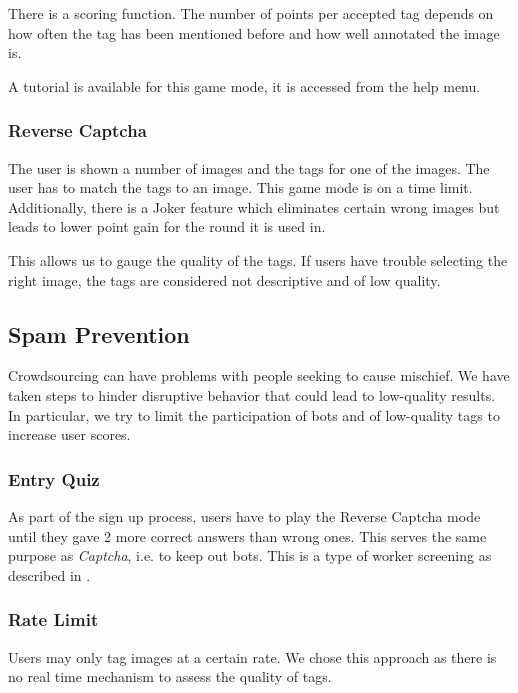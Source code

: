 There is a scoring function. The number of points per accepted tag depends on how often the tag has been mentioned before and how well annotated the image is.

A tutorial is available for this game mode, it is accessed from the help menu.

\subsubsection{Reverse Captcha}
\label{g14:sec:concepts:Gamemodes:reversecaptca}
The user is shown a number of images and the tags for one of the images. The user has to match the tags to an image.
This game mode is on a time limit. Additionally, there is a Joker feature which eliminates certain wrong images but leads to lower point gain for the round it is used in.

This allows us to gauge the quality of the tags. If users have trouble selecting the right image, the tags are considered not descriptive and of low quality.


\subsection{Spam Prevention}
\label{g14:sec:concepts:spamprevention}
Crowdsourcing can have problems with people seeking to cause mischief. We have taken steps to hinder disruptive behavior that could lead to low-quality results. In particular, we try to limit the participation of bots and  of low-quality tags to increase user scores.


\subsubsection{Entry Quiz}
\label{g14:sec:concepts:spamprevention:entryquiz}
As part of the sign up process, users have to play the Reverse Captcha mode until they gave 2 more correct answers than wrong ones. This serves the same purpose as \textit{Captcha}, i.e. to keep out bots. This is a type of worker screening as described in \cite{oleson2011programmatic}.


\subsubsection{Rate Limit}
\label{g14:sec:concepts:spamprevention:ratelimit}
Users may only tag images at a certain rate. We chose this approach as there is no real time mechanism to assess the quality of tags.


